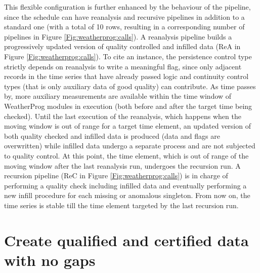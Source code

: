 \documentclass[authoryear,preprint,review,12pt]{elsarticle}
\newcommand{\note}[1]{\emph{\textcolor{red}{#1}}}
\begin{document}
This flexible configuration is further enhanced by the behaviour of the pipeline, since the schedule can have reanalysis and recursive pipelines in addition to a standard one (with a total of 10 rows, resulting in a corresponding number of pipelines in Figure \ref{Fig:weatherprog:calls}).
A reanalysis pipeline builds a progressively updated version of quality controlled and infilled data (ReA in Figure \ref{Fig:weatherprog:calls}).
To cite an instance, the persistence control type strictly depends on reanalysis to write a meaningful flag, since only adjacent records in the time series that have already passed logic and continuity control types (that is only auxiliary data of good quality) can contribute. %
As time passes by, more auxiliary measurements are available within the time window of WeatherProg modules in execution (both before and after the target time being checked). 
Until the last execution of the reanalysis, which happens when the moving window is out of range for a target time element, an updated version of both quality checked and infilled data is produced (data and flags are overwritten) while infilled data undergo a separate process and are not subjected to quality control.
At this point, the time element, which is out of range of the moving window after the last reanalysis run, undergoes the recursion run.
A recursion pipeline (ReC in Figure \ref{Fig:weatherprog:calls}) is in charge of performing a quality check including infilled data and eventually performing a new infill procedure for each missing or anomalous singleton.
From now on, the time series is stable till the time element targeted by the last recursion run.

\section{Create qualified and certified data with no gaps} \label{sec:qck+fill}
\end{document}
